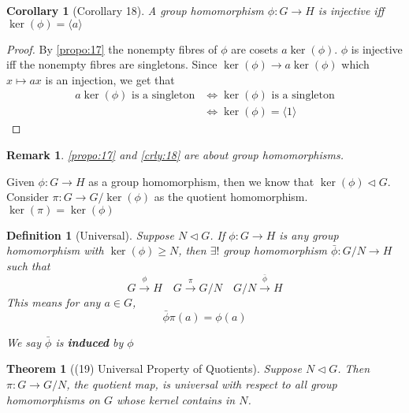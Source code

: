 \documentclass[11pt, oneside]{book}
\theoremstyle{break}
\newtheorem{thm}{Theorem}[section]
\newtheorem*{proof}{Proof}
\newtheorem{crly}{Corollary}[section]
\newtheorem*{remark}{Remark}
\newtheorem{defn}{Definition}[section]
\begin{document}
\begin{crly}[Corollary 18]\label{crly:18}
    A group homomorphism $\phi: G \to H$ is injective iff $\ker(\phi) = \langle a \rangle$
\end{crly}

\begin{proof}
    By \autoref{propo:17} the nonempty fibres of $\phi$ are cosets $a \ker(\phi)$. $\phi$ is injective iff the nonempty fibres are singletons. Since $\ker(\phi) \to a\ker(\phi)$ which $x \mapsto ax$ is an injection, we get that
    \begin{align*}
        a \ker(\phi) \text{ is a singleton} &\iff \ker(\phi) \text{ is a singleton} \\
            &\iff \ker(\phi) = \langle 1 \rangle
    \end{align*}
\end{proof}

\begin{remark}
    \autoref{propo:17} and \autoref{crly:18} are about group homomorphisms.
\end{remark}

Given $\phi : G \to H$ as a group homomorphism, then we know that $\ker(\phi) \triangleleft G$. Consider $\pi : G \to G / \ker(\phi)$ as the quotient homomorphism. $\ker(\pi) = \ker(\phi)$

\begin{defn}[Universal]
    Suppose $N \triangleleft G$. If $\phi: G \to H$ is any group homomorphism with $\ker(\phi) \geq N$, then $\exists!$ group homomorphism $\bar{\phi} : G / N \to H$ such that
    \begin{equation}
        G \overset{\phi}{\to} H \quad G \overset{\pi}{\to} G / N \quad G / N \overset{\bar{\phi}}{\to} H
    \end{equation}
    This means for any $a \in G$,
    \begin{equation}
        \bar{\phi} \pi(a) = \phi(a)
    \end{equation}

    We say $\bar{\phi}$ is \textbf{induced} by $\phi$
\end{defn}

\begin{thm}[(19) Universal Property of Quotients]\label{thm:19}
    Suppose $N \triangleleft G$. Then $\pi : G \to G / N$, the quotient map, is universal with respect to all group homomorphisms on $G$ whose kernel contains in $N$.
\end{thm}
\end{document}
